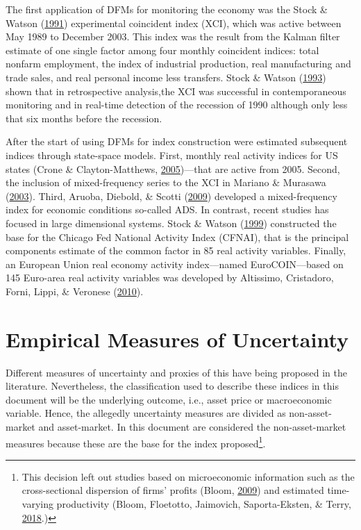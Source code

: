\documentclass[12pt,twoside]{reedthesis}
\begin{document}
The first application of DFMs for monitoring the economy was the Stock \& Watson (\protect\hyperlink{ref-stocwats:1991}{1991}) experimental coincident index (XCI), which was active between May 1989 to December 2003. This index was the result from the Kalman filter estimate of one single factor among four monthly coincident indices: total nonfarm employment, the index of industrial production, real manufacturing and trade sales, and real personal income less transfers. Stock \& Watson (\protect\hyperlink{ref-stocwats:1993}{1993}) shown that in retrospective analysis,the XCI was successful in contemporaneous monitoring and in real-time detection of the recession of 1990 although only less that six months before the recession.

After the start of using DFMs for index construction were estimated subsequent indices through state-space models. First, monthly real activity indices for US states (Crone \& Clayton-Matthews, \protect\hyperlink{ref-cronclay:2005}{2005})---that are active from 2005. Second, the inclusion of mixed-frequency series to the XCI in Mariano \& Murasawa (\protect\hyperlink{ref-marimura:2003}{2003}). Third, Aruoba, Diebold, \& Scotti (\protect\hyperlink{ref-aruoetal:2009}{2009}) developed a mixed-frequency index for economic conditions so-called ADS. In contrast, recent studies has focused in large dimensional systems. Stock \& Watson (\protect\hyperlink{ref-stocwats:1999}{1999}) constructed the base for the Chicago Fed National Activity Index (CFNAI), that is the principal components estimate of the common factor in 85 real activity variables. Finally, an European Union real economy activity index---named EuroCOIN---based on 145 Euro-area real activity variables was developed by Altissimo, Cristadoro, Forni, Lippi, \& Veronese (\protect\hyperlink{ref-altietal:2010}{2010}).

\hypertarget{empirical-measures-of-uncertainty}{%
\section{Empirical Measures of Uncertainty}\label{empirical-measures-of-uncertainty}}

Different measures of uncertainty and proxies of this have being proposed in the literature. Nevertheless, the classification used to describe these indices in this document will be the underlying outcome, i.e., asset price or macroeconomic variable. Hence, the allegedly uncertainty measures are divided as non-asset-market and asset-market. In this document are considered the non-asset-market measures because these are the base for the index proposed\footnote{This decision left out studies based on microeconomic information such as the cross-sectional dispersion of ﬁrms' proﬁts (Bloom, \protect\hyperlink{ref-bloom:2009}{2009}) and estimated time-varying productivity (Bloom, Floetotto, Jaimovich, Saporta-Eksten, \& Terry, \protect\hyperlink{ref-blooetal:2018}{2018}.)}.
\end{document}
